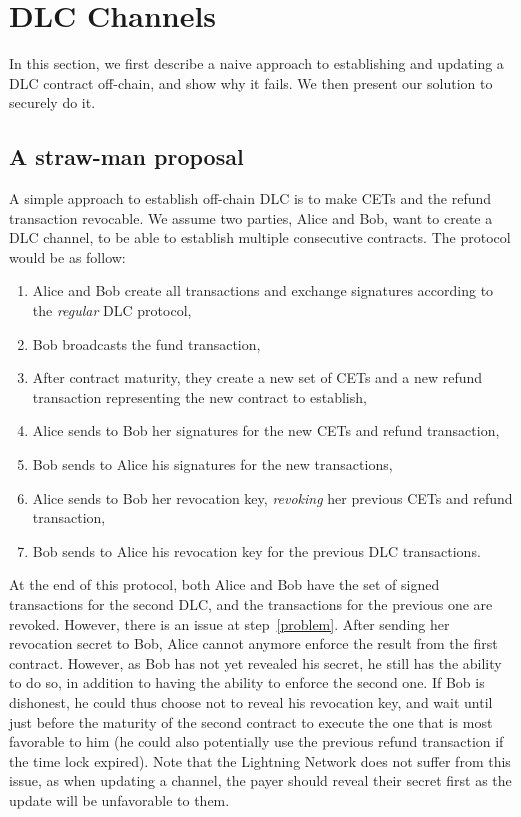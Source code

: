\section{DLC Channels}\label{offdlc}

In this section, we first describe a naive approach to establishing and updating a DLC contract off-chain, and show why it fails.
We then present our solution to securely do it.

\subsection{A straw-man proposal}\label{strawman}

A simple approach to establish off-chain DLC is to make CETs and the refund transaction revocable.
We assume two parties, Alice and Bob, want to create a DLC channel, to be able to establish multiple consecutive contracts.
The protocol would be as follow:
\begin{enumerate}
  \item Alice and Bob create all transactions and exchange signatures according to the \emph{regular} DLC protocol,
  \item Bob broadcasts the fund transaction,
  \item After contract maturity, they create a new set of CETs and a new refund transaction representing the new contract to establish,
  \item Alice sends to Bob her signatures for the new CETs and refund transaction,
  \item Bob sends to Alice his signatures for the new transactions,
  \item\label{problem} Alice sends to Bob her revocation key, \emph{revoking} her previous CETs and refund transaction,
  \item Bob sends to Alice his revocation key for the previous DLC transactions.
\end{enumerate}

At the end of this protocol, both Alice and Bob have the set of signed transactions for the second DLC, and the transactions for the previous one are revoked.
However, there is an issue at step~\ref{problem}.
After sending her revocation secret to Bob, Alice cannot anymore enforce the result from the first contract.
However, as Bob has not yet revealed his secret, he still has the ability to do so, in addition to having the ability to enforce the second one.
If Bob is dishonest, he could thus choose not to reveal his revocation key, and wait until just before the maturity of the second contract to execute the one that is most favorable to him (he could also potentially use the previous refund transaction if the time lock expired).
Note that the Lightning Network does not suffer from this issue, as when updating a channel, the payer should reveal their secret first as the update will be unfavorable to them.

